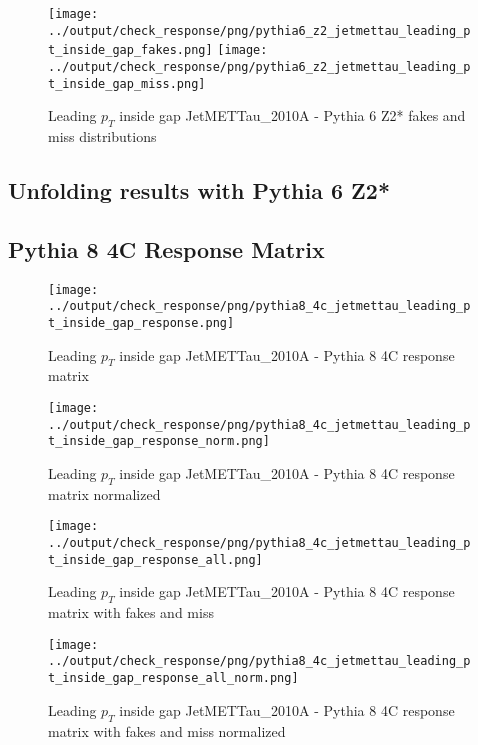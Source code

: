\documentclass[11pt]{book}
\begin{document}
\begin{figure}[ht]
\centering
\texttt{[image: ../output/check\_response/png/pythia6\_z2\_jetmettau\_leading\_pt\_inside\_gap\_fakes.png]}
\texttt{[image: ../output/check\_response/png/pythia6\_z2\_jetmettau\_leading\_pt\_inside\_gap\_miss.png]}
\caption{Leading $p_{T}$ inside gap JetMETTau\_2010A - Pythia 6 Z2* fakes and miss distributions}
\label{p6_jetmettau_leading_pt_inside_gap_fakesmiss}
\end{figure}


\clearpage
\subsection{Unfolding results with Pythia 6 Z2*}


\clearpage
\subsection{Pythia 8 4C Response Matrix}


\begin{figure}[ht]
\centering
\texttt{[image: ../output/check\_response/png/pythia8\_4c\_jetmettau\_leading\_pt\_inside\_gap\_response.png]}
\caption{Leading $p_{T}$ inside gap JetMETTau\_2010A - Pythia 8 4C response matrix}
\label{p8_jetmettau_leading_pt_inside_gap_response}
\end{figure}

\begin{figure}[ht]
\centering
\texttt{[image: ../output/check\_response/png/pythia8\_4c\_jetmettau\_leading\_pt\_inside\_gap\_response\_norm.png]}
\caption{Leading $p_{T}$ inside gap JetMETTau\_2010A - Pythia 8 4C response matrix normalized}
\label{p8_jetmettau_leading_pt_inside_gap_response_norm}
\end{figure}

\begin{figure}[ht]
\centering
\texttt{[image: ../output/check\_response/png/pythia8\_4c\_jetmettau\_leading\_pt\_inside\_gap\_response\_all.png]}
\caption{Leading $p_{T}$ inside gap JetMETTau\_2010A - Pythia 8 4C response matrix with fakes and miss}
\label{p8_jetmettau_leading_pt_inside_gap_response_all}
\end{figure}

\begin{figure}[ht]
\centering
\texttt{[image: ../output/check\_response/png/pythia8\_4c\_jetmettau\_leading\_pt\_inside\_gap\_response\_all\_norm.png]}
\caption{Leading $p_{T}$ inside gap JetMETTau\_2010A - Pythia 8 4C response matrix with fakes and miss normalized}
\label{p8_jetmettau_leading_pt_inside_gap_response_all_norm}
\end{figure}
\end{document}
